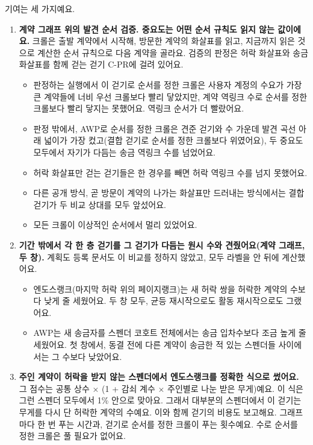 기여는 세 가지예요.
\begin{enumerate}
\item \textbf{계약 그래프 위의 발견 순서 검증. 중요도는 어떤 순서 규칙도 읽지 않는 값이에요.} 크롤은 출발 계약에서 시작해, 방문한 계약의 화살표를 읽고, 지금까지 읽은 것으로 계산한 순서 규칙으로 다음 계약을 골라요. 검증의 판정은 허락 화살표와 송금 화살표를 함께 걷는 걷기 C-PR에 걸려 있어요.
\begin{itemize}
\item 판정하는 실행에서 이 걷기로 순서를 정한 크롤은 사용자 계정의 수요가 가장 큰 계약들에 너비 우선 크롤보다 빨리 닿았지만, 계약 역링크 수로 순서를 정한 크롤보다 빨리 닿지는 못했어요. 역링크 순서가 더 빨랐어요.
\item 판정 밖에서, AWP로 순서를 정한 크롤은 견준 걷기와 수 가운데 발견 곡선 아래 넓이가 가장 컸고(결합 걷기로 순서를 정한 크롤보다 위였어요), 두 중요도 모두에서 자기가 다듬는 송금 역링크 수를 넘었어요.
\item 허락 화살표만 걷는 걷기들은 한 경우를 빼면 허락 역링크 수를 넘지 못했어요.
\item 다른 공개 방식, 곧 방문이 계약의 나가는 화살표만 드러내는 방식에서는 결합 걷기가 두 비교 상대를 모두 앞섰어요.
\item 모든 크롤이 이상적인 순서에서 멀리 있었어요.
\end{itemize}
\item \textbf{기간 밖에서 각 한 층 걷기를 그 걷기가 다듬는 원시 수와 견줬어요(계약 그래프, 두 창).} 계획도 등록 문서도 이 비교를 정하지 않았고, 모두 라벨을 안 뒤에 계산했어요.
\begin{itemize}
\item 엔도스랭크(마지막 허락 위의 페이지랭크)는 새 허락 쌍을 허락한 계약의 수보다 낮게 줄 세웠어요. 두 창 모두, 균등 재시작으로도 활동 재시작으로도 그랬어요.
\item AWP는 새 송금자를 스펜더 코호트 전체에서는 송금 입차수보다 조금 높게 줄 세웠어요. 첫 창에서, 동결 전에 다른 계약이 송금한 적 있는 스펜더들 사이에서는 그 수보다 낮았어요.
\end{itemize}
\item \textbf{주인 계약이 허락을 받지 않는 스펜더에서 엔도스랭크를 정확한 식으로 썼어요.} 그 점수는 공통 상수 × (1 + 감쇠 계수 × 주인별로 나눈 받은 무게)예요. 이 식은 그런 스펜더 모두에서 1\% 안으로 맞아요. 그래서 대부분의 스펜더에서 이 걷기는 무게를 다시 단 허락한 계약의 수예요. 이와 함께 걷기의 비용도 보고해요. 그래프마다 한 번 푸는 시간과, 걷기로 순서를 정한 크롤이 푸는 횟수예요. 수로 순서를 정한 크롤은 풀 필요가 없어요.
\end{enumerate}

